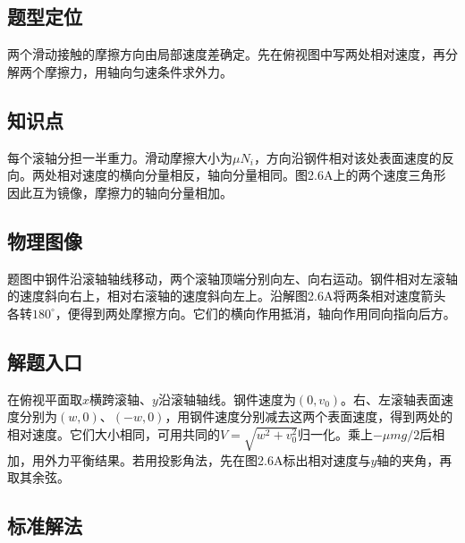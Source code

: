\documentclass[UTF8,fontset=fandol,a4paper,11pt]{ctexart}
\begin{document}


\subsection*{题型定位}

两个滑动接触的摩擦方向由局部速度差确定。先在俯视图中写两处相对速度，再分解两个摩擦力，用轴向匀速条件求外力。



\subsection*{知识点}

每个滚轴分担一半重力。滑动摩擦大小为$\mu N_i$，方向沿钢件相对该处表面速度的反向。两处相对速度的横向分量相反，轴向分量相同。图2.6A上的两个速度三角形因此互为镜像，摩擦力的轴向分量相加。




\subsection*{物理图像}

题图中钢件沿滚轴轴线移动，两个滚轴顶端分别向左、向右运动。钢件相对左滚轴的速度斜向右上，相对右滚轴的速度斜向左上。沿解图2.6A将两条相对速度箭头各转$180^\circ$，便得到两处摩擦方向。它们的横向作用抵消，轴向作用同向指向后方。



\subsection*{解题入口}

在俯视平面取$x$横跨滚轴、$y$沿滚轴轴线。钢件速度为$(0,v_0)$。右、左滚轴表面速度分别为$(w,0)$、$(-w,0)$，用钢件速度分别减去这两个表面速度，得到两处的相对速度。它们大小相同，可用共同的$V=\sqrt{w^2+v_0^2}$归一化。乘上$-\mu mg/2$后相加，用外力平衡结果。若用投影角法，先在图2.6A标出相对速度与$y$轴的夹角，再取其余弦。



\subsection*{标准解法}
\end{document}
